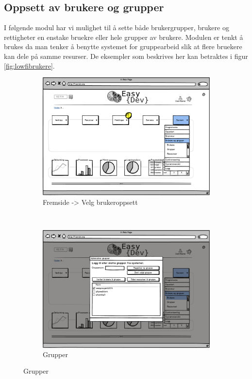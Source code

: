 \subsection{Oppsett av brukere og grupper}
I følgende modul har vi mulighet til å sette både brukergrupper, brukere og rettigheter en enstake bruekre eller hele grupper av brukere. Modulen er tenkt å brukes da man tenker å benytte systemet for gruppearbeid slik at flere bruekere kan dele på samme resurser. De eksempler som beskrives her kan betraktes i figur \ref{fig:lowfibrukere}. 
\begin{figure}[h]
        \centering
        \begin{subfigure}[b]{0.48\textwidth}
                \includegraphics[width=\textwidth]
                {./img/prosessdokumentasjon/lowfi/b1.png}
                \caption{Fremside -> Velg brukeroppsett}
                \label{fig:brukere1}
        \end{subfigure}%
        ~ %
        \begin{subfigure}[b]{0.48\textwidth}
                \includegraphics[width=\textwidth]
                {./img/prosessdokumentasjon/lowfi/b2.png}
                \caption{Grupper}
                \label{fig:brukere2}
        \end{subfigure}
       

\end{figure}
